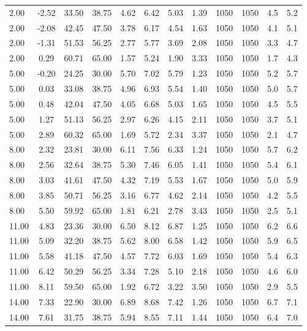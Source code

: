 \documentclass[english]{SPFShortReport}
\begin{document}
\begin{table}[!ht]
\begin{small}
\begin{center}
{\begin{tabular}{l | c c c c c c c c c c c }
2.00 & -2.52 & 33.50 & 38.75 & 4.62 & 6.42 & 5.03 & 1.39 & 1050 & 1050 & 4.5 & 5.2\\ 
2.00 & -2.08 & 42.45 & 47.50 & 3.78 & 6.17 & 4.54 & 1.63 & 1050 & 1050 & 4.1 & 5.1\\ 
2.00 & -1.31 & 51.53 & 56.25 & 2.77 & 5.77 & 3.69 & 2.08 & 1050 & 1050 & 3.3 & 4.7\\ 
2.00 & 0.29 & 60.71 & 65.00 & 1.57 & 5.24 & 1.90 & 3.33 & 1050 & 1050 & 1.7 & 4.3\\ 
5.00 & -0.20 & 24.25 & 30.00 & 5.70 & 7.02 & 5.79 & 1.23 & 1050 & 1050 & 5.2 & 5.7\\ 
5.00 & 0.03 & 33.08 & 38.75 & 4.96 & 6.93 & 5.54 & 1.40 & 1050 & 1050 & 5.0 & 5.7\\ 
5.00 & 0.48 & 42.04 & 47.50 & 4.05 & 6.68 & 5.03 & 1.65 & 1050 & 1050 & 4.5 & 5.5\\ 
5.00 & 1.27 & 51.13 & 56.25 & 2.97 & 6.26 & 4.15 & 2.11 & 1050 & 1050 & 3.7 & 5.1\\ 
5.00 & 2.89 & 60.32 & 65.00 & 1.69 & 5.72 & 2.34 & 3.37 & 1050 & 1050 & 2.1 & 4.7\\ 
8.00 & 2.32 & 23.81 & 30.00 & 6.11 & 7.56 & 6.33 & 1.24 & 1050 & 1050 & 5.7 & 6.2\\ 
8.00 & 2.56 & 32.64 & 38.75 & 5.30 & 7.46 & 6.05 & 1.41 & 1050 & 1050 & 5.4 & 6.1\\ 
8.00 & 3.03 & 41.61 & 47.50 & 4.32 & 7.19 & 5.53 & 1.67 & 1050 & 1050 & 5.0 & 5.9\\ 
8.00 & 3.85 & 50.71 & 56.25 & 3.16 & 6.77 & 4.62 & 2.14 & 1050 & 1050 & 4.2 & 5.5\\ 
8.00 & 5.50 & 59.92 & 65.00 & 1.81 & 6.21 & 2.78 & 3.43 & 1050 & 1050 & 2.5 & 5.1\\ 
11.00 & 4.83 & 23.36 & 30.00 & 6.50 & 8.12 & 6.87 & 1.25 & 1050 & 1050 & 6.2 & 6.6\\ 
11.00 & 5.09 & 32.20 & 38.75 & 5.62 & 8.00 & 6.58 & 1.42 & 1050 & 1050 & 5.9 & 6.5\\ 
11.00 & 5.58 & 41.18 & 47.50 & 4.57 & 7.72 & 6.03 & 1.69 & 1050 & 1050 & 5.4 & 6.3\\ 
11.00 & 6.42 & 50.29 & 56.25 & 3.34 & 7.28 & 5.10 & 2.18 & 1050 & 1050 & 4.6 & 6.0\\ 
11.00 & 8.11 & 59.50 & 65.00 & 1.92 & 6.72 & 3.22 & 3.50 & 1050 & 1050 & 2.9 & 5.5\\ 
14.00 & 7.33 & 22.90 & 30.00 & 6.89 & 8.68 & 7.42 & 1.26 & 1050 & 1050 & 6.7 & 7.1\\ 
14.00 & 7.61 & 31.75 & 38.75 & 5.94 & 8.55 & 7.11 & 1.44 & 1050 & 1050 & 6.4 & 7.0\\ 

\end{tabular}}
\end{center}
\end{small}
\end{table}
\end{document}
